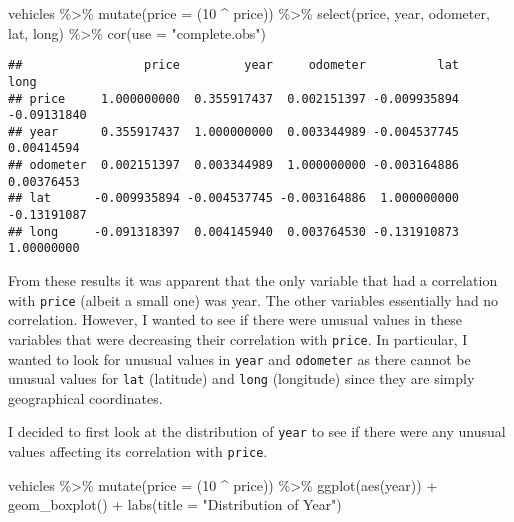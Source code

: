 \documentclass[
]{article}
\newenvironment{Shaded}{\begin{snugshade}}{\end{snugshade}}
\newcommand{\AttributeTok}[1]{\textcolor[rgb]{0.77,0.63,0.00}{#1}}
\newcommand{\DecValTok}[1]{\textcolor[rgb]{0.00,0.00,0.81}{#1}}
\newcommand{\FunctionTok}[1]{\textcolor[rgb]{0.00,0.00,0.00}{#1}}
\newcommand{\NormalTok}[1]{#1}
\newcommand{\SpecialCharTok}[1]{\textcolor[rgb]{0.00,0.00,0.00}{#1}}
\newcommand{\StringTok}[1]{\textcolor[rgb]{0.31,0.60,0.02}{#1}}
\begin{document}
\begin{Shaded}
\begin{Highlighting}[]
\NormalTok{vehicles }\SpecialCharTok{\%\textgreater{}\%} 
  \FunctionTok{mutate}\NormalTok{(}\AttributeTok{price =}\NormalTok{ (}\DecValTok{10} \SpecialCharTok{\^{}}\NormalTok{ price)) }\SpecialCharTok{\%\textgreater{}\%} 
  \FunctionTok{select}\NormalTok{(price, year, odometer, lat, long) }\SpecialCharTok{\%\textgreater{}\%} 
  \FunctionTok{cor}\NormalTok{(}\AttributeTok{use =} \StringTok{"complete.obs"}\NormalTok{)}
\end{Highlighting}
\end{Shaded}

\begin{verbatim}
##                 price         year     odometer          lat        long
## price     1.000000000  0.355917437  0.002151397 -0.009935894 -0.09131840
## year      0.355917437  1.000000000  0.003344989 -0.004537745  0.00414594
## odometer  0.002151397  0.003344989  1.000000000 -0.003164886  0.00376453
## lat      -0.009935894 -0.004537745 -0.003164886  1.000000000 -0.13191087
## long     -0.091318397  0.004145940  0.003764530 -0.131910873  1.00000000
\end{verbatim}

From these results it was apparent that the only variable that had a
correlation with \texttt{price} (albeit a small one) was year. The other
variables essentially had no correlation. However, I wanted to see if
there were unusual values in these variables that were decreasing their
correlation with \texttt{price}. In particular, I wanted to look for
unusual values in \texttt{year} and \texttt{odometer} as there cannot be
unusual values for \texttt{lat} (latitude) and \texttt{long} (longitude)
since they are simply geographical coordinates.

I decided to first look at the distribution of \texttt{year} to see if
there were any unusual values affecting its correlation with
\texttt{price}.

\begin{Shaded}
\begin{Highlighting}[]
\NormalTok{vehicles }\SpecialCharTok{\%\textgreater{}\%} 
  \FunctionTok{mutate}\NormalTok{(}\AttributeTok{price =}\NormalTok{ (}\DecValTok{10} \SpecialCharTok{\^{}}\NormalTok{ price)) }\SpecialCharTok{\%\textgreater{}\%} 
  \FunctionTok{ggplot}\NormalTok{(}\FunctionTok{aes}\NormalTok{(year)) }\SpecialCharTok{+} 
  \FunctionTok{geom\_boxplot}\NormalTok{() }\SpecialCharTok{+} 
  \FunctionTok{labs}\NormalTok{(}\AttributeTok{title =} \StringTok{"Distribution of Year"}\NormalTok{)}
\end{Highlighting}
\end{Shaded}
\end{document}

